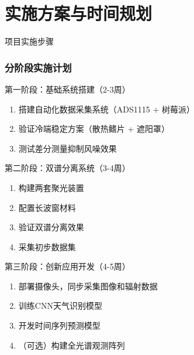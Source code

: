 \documentclass[aspectratio=169,11pt]{ctexbeamer}
\begin{document}
\section{实施方案与时间规划}

\begin{frame}{项目实施步骤}
\frametitle{分阶段实施计划}
\begin{block}{第一阶段：基础系统搭建（2-3周）}
\begin{enumerate}
    \item 搭建自动化数据采集系统（ADS1115 + 树莓派）
    \item 验证冷端稳定方案（散热鳍片 + 遮阳罩）
    \item 测试差分测量抑制风噪效果
\end{enumerate}
\end{block}

\begin{block}{第二阶段：双谱分离系统（3-4周）}
\begin{enumerate}
    \item 构建两套聚光装置
    \item 配置长波窗材料
    \item 验证双谱分离效果
    \item 采集初步数据集
\end{enumerate}
\end{block}

\begin{block}{第三阶段：创新应用开发（4-5周）}
\begin{enumerate}
    \item 部署摄像头，同步采集图像和辐射数据
    \item 训练CNN天气识别模型
    \item 开发时间序列预测模型
    \item （可选）构建全光谱观测阵列
\end{enumerate}
\end{block}
\end{frame}
\end{document}
